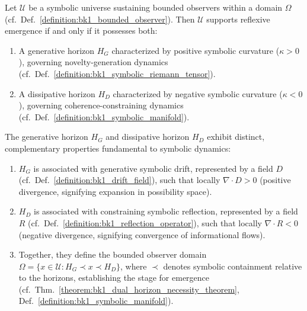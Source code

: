 \begin{theorem}
\label{theorem:bk1_dual_horizon_necessity_theorem}
Let $\mathcal{U}$ be a symbolic universe sustaining bounded observers within a domain $\Omega$ (cf.~Def.~\ref{definition:bk1_bounded_observer}). Then $\mathcal{U}$ supports reflexive emergence if and only if it possesses both:
\begin{enumerate}
  \item A generative horizon $H_G$ characterized by positive symbolic curvature ($\kappa > 0$), governing novelty-generation dynamics (cf.~Def.~\ref{definition:bk1_symbolic_riemann_tensor}).
  \item A dissipative horizon $H_D$ characterized by negative symbolic curvature ($\kappa < 0$), governing coherence-constraining dynamics (cf.~Def.~\ref{definition:bk1_symbolic_manifold}).
\end{enumerate}
\end{theorem}
\begin{lemma}
\label{lemma:bk1_horizon_characterization}
The generative horizon $H_G$ and dissipative horizon $H_D$ exhibit distinct, complementary properties fundamental to symbolic dynamics:
\begin{enumerate}
  \item $H_G$ is associated with generative symbolic drift, represented by a field $D$ (cf.~Def.~\ref{definition:bk1_drift_field}), such that locally $\nabla \cdot D > 0$ (positive divergence, signifying expansion in possibility space).
  \item $H_D$ is associated with constraining symbolic reflection, represented by a field $R$ (cf.~Def.~\ref{definition:bk1_reflection_operator}), such that locally $\nabla \cdot R < 0$ (negative divergence, signifying convergence of informational flows).
  \item Together, they define the bounded observer domain $\Omega = \{x \in \mathcal{U} : H_G \prec x \prec H_D\}$, where $\prec$ denotes symbolic containment relative to the horizons, establishing the stage for emergence (cf.~Thm.~\ref{theorem:bk1_dual_horizon_necessity_theorem}, Def.~\ref{definition:bk1_symbolic_manifold}).
\end{enumerate}
\end{lemma}

